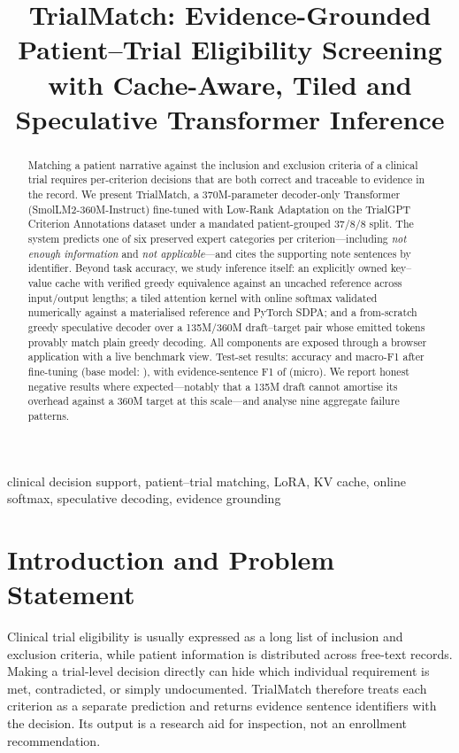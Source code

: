 \documentclass[conference]{IEEEtran}
\title{TrialMatch: Evidence-Grounded Patient--Trial Eligibility Screening\\
with Cache-Aware, Tiled and Speculative Transformer Inference}
\author{\IEEEauthorblockN{Abdullah Amin}
\IEEEauthorblockA{Generative AI, Semester 7\\
Individual assignment submission}}
\begin{document}
\maketitle

\begin{abstract}
Matching a patient narrative against the inclusion and exclusion criteria of a clinical
trial requires per-criterion decisions that are both correct and traceable to evidence in
the record. We present TrialMatch, a 370M-parameter decoder-only Transformer
(SmolLM2-360M-Instruct) fine-tuned with Low-Rank Adaptation on the TrialGPT Criterion
Annotations dataset under a mandated patient-grouped 37/8/8 split. The system predicts one
of six preserved expert categories per criterion---including \emph{not enough information}
and \emph{not applicable}---and cites the supporting note sentences by identifier. Beyond
task accuracy, we study inference itself: an explicitly owned key--value cache with
verified greedy equivalence against an uncached reference across input/output lengths; a
tiled attention kernel with online softmax validated numerically against a materialised
reference and PyTorch SDPA; and a from-scratch greedy speculative decoder over a
135M/360M draft--target pair whose emitted tokens provably match plain greedy decoding.
All components are exposed through a browser application with a live benchmark view.
Test-set results: \TunedTestAcc{} accuracy and \TunedTestMacroF{} macro-F1 after
fine-tuning (base model: \BaseTestAcc{}), with evidence-sentence F1 of
\TunedTestEvFone{} (micro). We report honest negative results where expected---notably
that a 135M draft cannot amortise its overhead against a 360M target at this scale---and
 analyse nine aggregate failure patterns.
\end{abstract}

\begin{IEEEkeywords}
clinical decision support, patient--trial matching, LoRA, KV cache, online softmax,
speculative decoding, evidence grounding
\end{IEEEkeywords}

\section{Introduction and Problem Statement}
Clinical trial eligibility is usually expressed as a long list of inclusion and
exclusion criteria, while patient information is distributed across free-text records.
Making a trial-level decision directly can hide which individual requirement is met,
contradicted, or simply undocumented. TrialMatch therefore treats each criterion as a
separate prediction and returns evidence sentence identifiers with the decision. Its
output is a research aid for inspection, not an enrollment recommendation.
\end{document}
